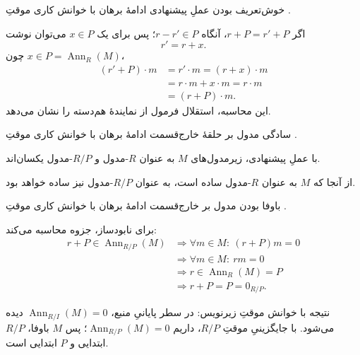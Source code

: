 \begin{frame}[t]{خوش‌تعریف بودن عملِ پیشنهادی}
    \label{lec14:quotient-action-well-defined}
    \alert{ادامهٔ برهان با خوانش کاری موقتِ .}
    \medskip

    اگر \(r+P=r'+P\)، آنگاه \(r-r'\in P\)؛ پس برای یک \(x\in P\) می‌توان نوشت
    \[
        r'=r+x.
    \]
    چون \(x\in P=\operatorname{Ann}_R(M)\)،
    \[
        \begin{aligned}
            (r'+P)\cdot m
            &=r'\cdot m=(r+x)\cdot m\\
            &=r\cdot m+x\cdot m=r\cdot m\\
            &=(r+P)\cdot m.
        \end{aligned}
    \]
    این محاسبه، استقلال فرمول از نمایندهٔ هم‌دسته را نشان می‌دهد.
\end{frame}

\begin{frame}[t]{سادگی مدول بر حلقهٔ خارج‌قسمت}
    \label{lec14:quotient-simple}
    \alert{ادامهٔ برهان با خوانش کاری موقتِ .}
    \medskip

    با عملِ پیشنهادی، زیرمدول‌های \(M\) به عنوان \(R\)-مدول و \(R/P\)-مدول یکسان‌اند.
    \medskip

    از آنجا که \(M\) به عنوان \(R\)-مدول ساده است، به عنوان \(R/P\)-مدول نیز ساده خواهد بود.
\end{frame}

\begin{frame}[t]{باوفا بودن مدول بر خارج‌قسمت}
    \label{lec14:quotient-faithful-pending}
    \alert{ادامهٔ برهان با خوانش کاری موقتِ .}
    \medskip

    برای نابودساز، جزوه محاسبه می‌کند:
    \[
        \begin{aligned}
            r+P\in\operatorname{Ann}_{R/P}(M)
            &\Longrightarrow \forall m\in M:\ (r+P)m=0\\
            &\Longrightarrow \forall m\in M:\ rm=0\\
            &\Longrightarrow r\in\operatorname{Ann}_R(M)=P\\
            &\Longrightarrow r+P=P=0_{R/P}.
        \end{aligned}
    \]
    \begin{alertblock}{نتیجه با خوانش موقتِ زیرنویس: }
        در سطر پایانیِ منبع، \(\operatorname{Ann}_{R/I}(M)=0\) دیده می‌شود. با جایگزینیِ موقتِ \(R/P\)، داریم \(\operatorname{Ann}_{R/P}(M)=0\)؛ پس \(M\) باوفا، \(R/P\) ابتدایی و \(P\) ابتدایی است.
    \end{alertblock}
\end{frame}
